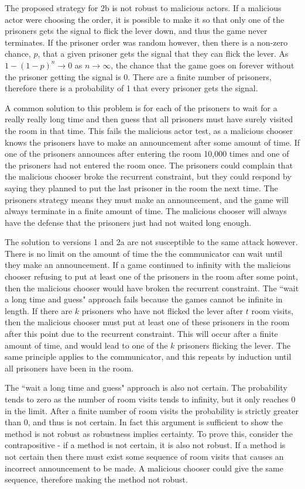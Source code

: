 The proposed strategy for 2b is not robust to malicious actors. If a malicious actor were choosing the order, it is possible to make it so that only one of the prisoners gets the signal to flick the lever down, and thus the game never terminates. If the prisoner order was random however, then there is a non-zero chance, $p$, that a given prisoner gets the signal that they can flick the lever. As $1 - (1 - p)^n \to 0$ as $n \to \infty$, the chance that the game goes on forever without the prisoner getting the signal is 0. There are a finite number of prisoners, therefore there is a probability of 1 that every prisoner gets the signal.

A common solution to this problem is for each of the prisoners to wait for a really really long time and then guess that all prisoners must have surely visited the room in that time. This fails the malicious actor test, as a malicious chooser knows the prisoners have to make an announcement after some amount of time. If one of the prisoners announces after entering the room 10,000 times and one of the prisoners had not entered the room once. The prisoners could complain that the malicious chooser broke the recurrent constraint, but they could respond by saying they planned to put the last prisoner in the room the next time. The prisoners strategy means they must make an announcement, and the game will always terminate in a finite amount of time. The malicious chooser will always have the defense that the prisoners just had not waited long enough.

The solution to versions 1 and 2a are not susceptible to the same attack however. There is no limit on the amount of time the the communicator can wait until they make an announcement. If a game continued to infinity with the malicious chooser refusing to put at least one of the prisoners in the room after some point, then the malicious chooser would have broken the recurrent constraint. The ``wait a long time and guess" approach fails because the games cannot be infinite in length. If there are $k$ prisoners who have not flicked the lever after $t$ room visits, then the malicious chooser must put at least one of these prisoners in the room after this point due to the recurrent constraint. This will occur after a finite amount of time, and would lead to one of the $k$ prisoners flicking the lever. The same principle applies to the communicator, and this repeats by induction until all prisoners have been in the room.

The ``wait a long time and guess" approach is also not certain. The probability tends to zero as the number of room visits tends to infinity, but it only reaches 0 in the limit. After a finite number of room visits the probability is strictly greater than 0, and thus is not certain. In fact this argument is sufficient to show the method is not robust as robustness implies certainty. To prove this, consider the contrapositive - if a method is not certain, it is also not robust. If a method is not certain then there must exist some sequence of room visits that causes an incorrect announcement to be made. A malicious chooser could give the same sequence, therefore making the method not robust.

